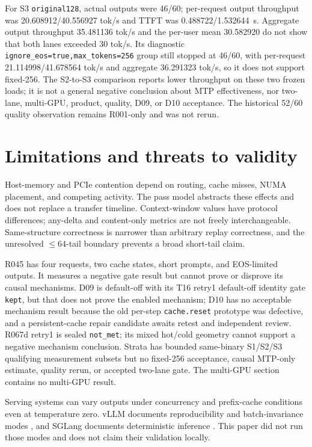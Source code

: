 \documentclass[11pt]{article}
\begin{document}
For S3 \texttt{original128}, actual outputs were 46/60; per-request output throughput was 20.608912/40.556927 tok/s and TTFT was 0.488722/1.532644~s. Aggregate output throughput 35.481136 tok/s and the per-user mean 30.582920 do not show that both lanes exceeded 30 tok/s. Its diagnostic \texttt{ignore\_eos=true,max\_tokens=256} group still stopped at 46/60, with per-request 21.114998/41.678564 tok/s and aggregate 36.291323 tok/s, so it does not support fixed-256. The S2-to-S3 comparison reports lower throughput on these two frozen loads; it is not a general negative conclusion about MTP effectiveness, nor two-lane, multi-GPU, product, quality, D09, or D10 acceptance. The historical 52/60 quality observation remains R001-only and was not rerun.

\section{Limitations and threats to validity}

Host-memory and PCIe contention depend on routing, cache misses, NUMA placement, and competing activity. The pass model abstracts these effects and does not replace a transfer timeline. Context-window values have protocol differences; any-delta and content-only metrics are not freely interchangeable. Same-structure correctness is narrower than arbitrary replay correctness, and the unresolved $\leq64$-tail boundary prevents a broad short-tail claim.

R045 has four requests, two cache states, short prompts, and EOS-limited outputs. It measures a negative gate result but cannot prove or disprove its causal mechanisms. D09 is default-off with its T16 retry1 default-off identity gate \texttt{kept}, but that does not prove the enabled mechanism; D10 has no acceptable mechanism result because the old per-step \texttt{cache.reset} prototype was defective, and a persistent-cache repair candidate awaits retest and independent review. R067d retry1 is sealed \texttt{not\_met}; its mixed hot/cold geometry cannot support a negative mechanism conclusion. Strata has bounded same-binary S1/S2/S3 qualifying measurement subsets but no fixed-256 acceptance, causal MTP-only estimate, quality rerun, or accepted two-lane gate. The multi-GPU section contains no multi-GPU result.

Serving systems can vary outputs under concurrency and prefix-cache conditions even at temperature zero. vLLM documents reproducibility and batch-invariance modes \cite{vllmrepro,vllmbatch}, and SGLang documents deterministic inference \cite{sglang}. This paper did not run those modes and does not claim their validation locally.
\end{document}
